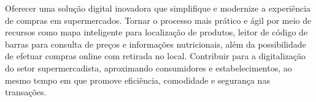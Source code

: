 \hspace{4.5mm}
Oferecer uma solução digital inovadora que simplifique e modernize a experiência de compras em supermercados. Tornar o processo mais prático e ágil por meio de recursos como mapa inteligente para localização de produtos, leitor de código de barras para consulta de preços e informações nutricionais, além da possibilidade de efetuar compras online com retirada no local. Contribuir para a digitalização do setor supermercadista, aproximando consumidores e estabelecimentos, ao mesmo tempo em que promove eficiência, comodidade e segurança nas transações.